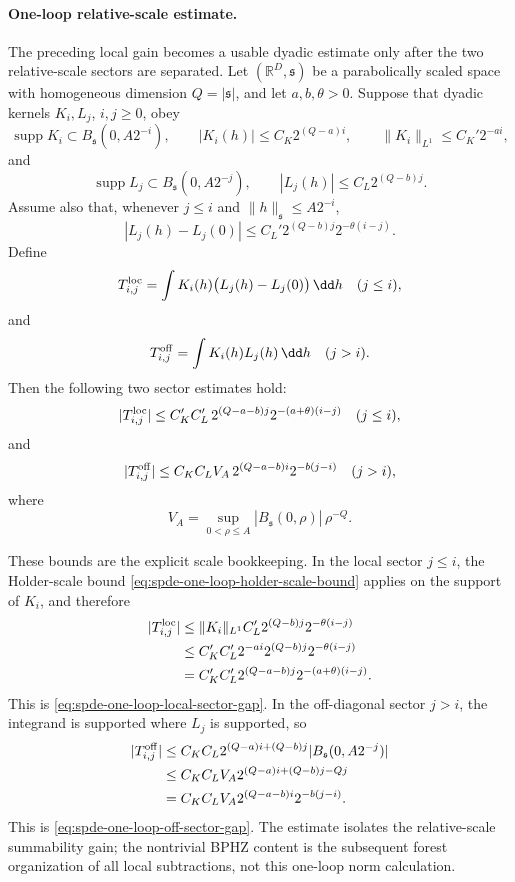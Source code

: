 \paragraph{One-loop relative-scale estimate.}
The preceding local gain becomes a usable dyadic estimate only after the two
relative-scale sectors are separated.  Let
\((\mathbb R^D,\mathfrak s)\) be a parabolically scaled space with homogeneous
dimension \(Q=|\mathfrak s|\), and let \(a,b,\theta>0\).  Suppose that dyadic
kernels \(K_i,L_j\), \(i,j\geq0\), obey
\[
  \operatorname{supp}K_i\subset B_{\mathfrak s}(0,A2^{-i}),\qquad
  |K_i(h)|\leq C_K2^{(Q-a)i},\qquad
  \|K_i\|_{L^1}\leq C_K'2^{-ai},
\]
and
\[
  \operatorname{supp}L_j\subset B_{\mathfrak s}(0,A2^{-j}),\qquad
  |L_j(h)|\leq C_L2^{(Q-b)j}.
\]
Assume also that, whenever \(j\leq i\) and
\(\|h\|_{\mathfrak s}\leq A2^{-i}\),
\begin{equation}
  |L_j(h)-L_j(0)|
  \leq
  C_L'2^{(Q-b)j}2^{-\theta(i-j)} .
  \label{eq:spde-one-loop-holder-scale-bound}
\end{equation}
Define
\[
  T_{i,j}^{\rm loc}
  =
  \int K_i(h)\bigl(L_j(h)-L_j(0)\bigr)\,\dd h
  \quad(j\leq i),
\]
and
\[
  T_{i,j}^{\rm off}
  =
  \int K_i(h)L_j(h)\,\dd h
  \quad(j>i).
\]
Then the following two sector estimates hold:
\begin{equation}
  |T_{i,j}^{\rm loc}|
  \leq
  C_K'C_L'\,
  2^{(Q-a-b)j}2^{-(a+\theta)(i-j)}
  \quad(j\leq i),
  \label{eq:spde-one-loop-local-sector-gap}
\end{equation}
and
\begin{equation}
  |T_{i,j}^{\rm off}|
  \leq
  C_KC_L V_A\,
  2^{(Q-a-b)i}2^{-b(j-i)}
  \quad(j>i),
  \label{eq:spde-one-loop-off-sector-gap}
\end{equation}
where
\[
  V_A=\sup_{0<\rho\leq A}|B_{\mathfrak s}(0,\rho)|\,\rho^{-Q}.
\]

These bounds are the explicit scale bookkeeping.  In the local sector
\(j\leq i\), the Holder-scale bound
\eqref{eq:spde-one-loop-holder-scale-bound} applies on the support of \(K_i\),
and therefore
\[
\begin{aligned}
  |T_{i,j}^{\rm loc}|
  &\leq
  \|K_i\|_{L^1}C_L'2^{(Q-b)j}2^{-\theta(i-j)}        \\
  &\leq
  C_K'C_L'
  2^{-ai}2^{(Q-b)j}2^{-\theta(i-j)}                  \\
  &=
  C_K'C_L'2^{(Q-a-b)j}2^{-(a+\theta)(i-j)} .
\end{aligned}
\]
This is \eqref{eq:spde-one-loop-local-sector-gap}.  In the off-diagonal sector
\(j>i\), the integrand is supported where \(L_j\) is supported, so
\[
\begin{aligned}
  |T_{i,j}^{\rm off}|
  &\leq
  C_KC_L2^{(Q-a)i+(Q-b)j}
  |B_{\mathfrak s}(0,A2^{-j})|                       \\
  &\leq
  C_KC_LV_A
  2^{(Q-a)i+(Q-b)j-Qj}                               \\
  &=
  C_KC_LV_A2^{(Q-a-b)i}2^{-b(j-i)} .
\end{aligned}
\]
This is \eqref{eq:spde-one-loop-off-sector-gap}.  The estimate isolates the
relative-scale summability gain; the nontrivial BPHZ content is the subsequent
forest organization of all local subtractions, not this one-loop norm
calculation.

